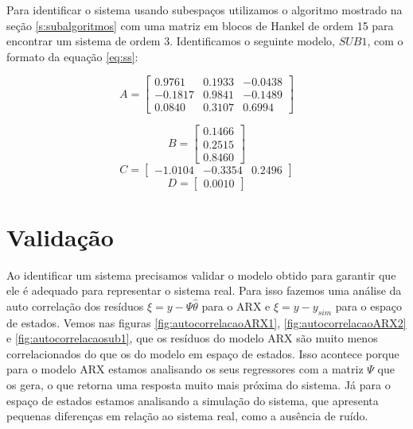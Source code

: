 Para identificar o sistema usando subespaços utilizamos o algoritmo mostrado na seção \ref{s:subalgoritmos} com uma matriz em blocos de Hankel de ordem 15 para encontrar um sistema de ordem 3. Identificamos o seguinte modelo, $SUB1$, com o formato da equação \eqref{eq:ss}:

\begin{equation}
A=\begin{bmatrix}
0.9761  &  0.1933 &  -0.0438\\
-0.1817  &  0.9841  & -0.1489\\
0.0840  &  0.3107  &  0.6994
\end{bmatrix}
\end{equation}

\begin{equation}
B=\begin{bmatrix}
0.1466\\
0.2515\\
0.8460
\end{bmatrix}
\end{equation}
\begin{equation}
C=\begin{bmatrix}
-1.0104 &  -0.3354 &   0.2496
\end{bmatrix}
\end{equation}
\begin{equation}
D=\begin{bmatrix}
0.0010
\end{bmatrix}
\end{equation}

\section{Validação}\label{s4:val}
Ao identificar um sistema precisamos validar o modelo obtido para garantir que ele é adequado para representar o sistema real. Para isso fazemos uma análise da auto correlação dos resíduos $\xi=y-\Psi \hat{\theta}$ para o ARX e $\xi=y-y_{sim}$ para o espaço de estados. Vemos nas figuras \ref{fig:autocorrelacaoARX1}, \ref{fig:autocorrelacaoARX2} e \ref{fig:autocorrelacaosub1}, que os resíduos do modelo ARX são muito menos correlacionados do que os do modelo em espaço de estados. Isso acontece porque para o modelo ARX estamos analisando os seus regressores com a matriz $\Psi$ que os gera, o que retorna uma resposta muito mais próxima do sistema. Já para o espaço de estados estamos analisando a simulação do sistema, que apresenta pequenas diferenças em relação ao sistema real, como a ausência de ruído.


